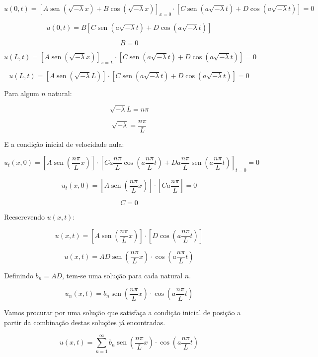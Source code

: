 \documentclass[12pt, a4paper, portuguese]{fphw}
\DeclareMathOperator{\sen}{sen}
\begin{document}
$$
u(0, t) = \left[
A \sen \left( \sqrt{-\lambda} x \right) + B \cos \left( \sqrt{-\lambda} x \right)
\right]_{x=0}
\cdot
\left[
C \sen \left( a\sqrt{-\lambda} t \right) + D \cos \left( a\sqrt{-\lambda} t \right)
\right] = 0
$$

$$
u(0, t) = B
\left[
C \sen \left( a\sqrt{-\lambda} t \right) + D \cos \left( a\sqrt{-\lambda} t \right)
\right]
$$

$$
B = 0
$$

$$
u(L, t) = \left[
A \sen \left( \sqrt{-\lambda} x \right)
\right]_{x=L}
\cdot
\left[
C \sen \left( a\sqrt{-\lambda} t \right) + D \cos \left( a\sqrt{-\lambda} t \right)
\right] = 0
$$

$$
u(L, t) = \left[
A \sen \left( \sqrt{-\lambda} L \right)
\right]
\cdot
\left[
C \sen \left( a\sqrt{-\lambda} t \right) + D \cos \left( a\sqrt{-\lambda} t \right)
\right] = 0
$$

Para algum $ n $ natural:

$$
\sqrt{-\lambda} L = n \pi
$$

$$
\sqrt{-\lambda} = \frac{n \pi}{L}
$$

E a condição inicial de velocidade nula:

$$
u_t(x, 0) = \left[
A \sen \left( \frac{n \pi}{L} x \right)
\right]
\cdot \left[
C a\frac{n \pi}{L} \cos \left( a\frac{n \pi}{L} t \right) + Da\frac{n \pi}{L} \sen \left( a\frac{n \pi}{L} t \right)
\right]_{t=0}
= 0
$$

$$
u_t(x, 0) = \left[
A \sen \left( \frac{n \pi}{L} x \right)
\right]
\cdot \left[
C a\frac{n \pi}{L}
\right]
= 0
$$

$$
C = 0
$$

Reescrevendo $ u(x, t) $:

$$
u(x, t) = \left[
A \sen \left( \frac{n \pi}{L} x \right)
\right]
\cdot
\left[
D \cos \left( a\frac{n \pi}{L} t \right)
\right]
$$

$$
u(x, t) =
AD \sen \left( \frac{n \pi}{L} x \right)
\cdot
\cos \left( a\frac{n \pi}{L} t \right)
$$

Definindo $ b_n = AD $, tem-se uma solução para cada natural $ n $.

$$
u_n(x, t) =
b_n \sen \left( \frac{n \pi}{L} x \right)
\cdot
\cos \left( a\frac{n \pi}{L} t \right)
$$

Vamos procurar por uma solução que satisfaça a condição inicial de posição a partir da combinação destas soluções já encontradas.

$$
u(x, t) = \sum_{n=1}^{\infty}
b_n \sen \left( \frac{n \pi}{L} x \right)
\cdot
\cos \left( a\frac{n \pi}{L} t \right)
$$
\end{document}
